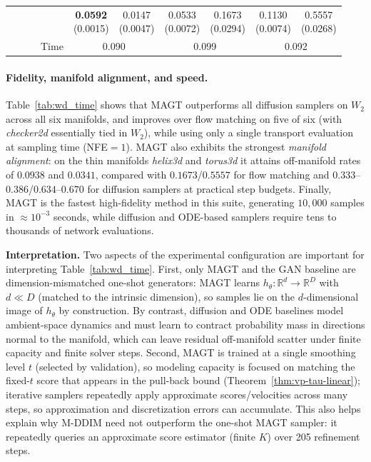 \documentclass[12pt]{article}
\theoremstyle{definition} %
\newcommand{\R}{\mathbb{R}}
\providecommand{\method}{MAGT} %
\begin{document}
\begin{table}
\begin{tabular}{l*{3}{cc}}
 & \makecell{\textbf{0.0592}\\\scriptsize(0.0015)} & \makecell{0.0147\\\scriptsize(0.0047)}
 & \makecell{0.0533\\\scriptsize(0.0072)} & \makecell{0.1673\\\scriptsize(0.0294)}
 & \makecell{0.1130\\\scriptsize(0.0074)} & \makecell{0.5557\\\scriptsize(0.0268)} \\
~~~~~~Time  & \multicolumn{2}{c}{0.090} & \multicolumn{2}{c}{0.099} & \multicolumn{2}{c}{0.092} \\
 \bottomrule
 \end{tabular}
 \end{table}
 \endgroup

\paragraph{Fidelity, manifold alignment, and speed.}
Table~\ref{tab:wd_time} shows that \method{} outperforms all diffusion samplers on $W_2$ across all six manifolds, and improves over flow matching on five of six (with \textit{checker2d} essentially tied in $W_2$), while using only a single transport evaluation at sampling time (NFE$=1$).
\method{} also exhibits the strongest \emph{manifold alignment}: on the thin manifolds \textit{helix3d} and \textit{torus3d} it attains off-manifold rates of $0.0938$ and $0.0341$, compared with $0.1673$/$0.5557$ for flow matching and $0.333$--$0.386$/$0.634$--$0.670$ for diffusion samplers at practical step budgets.
Finally, \method{} is the fastest high-fidelity method in this suite, generating $10{,}000$ samples in $\approx 10^{-3}$ seconds, while diffusion and ODE-based samplers require tens to thousands of network evaluations.

\smallskip
\noindent\textbf{Interpretation.}
Two aspects of the experimental configuration are important for interpreting Table~\ref{tab:wd_time}.
First, only \method{} and the GAN baseline are dimension-mismatched one-shot generators: \method{} learns $h_{\theta}:\R^d\to\R^D$ with $d\ll D$ (matched to the intrinsic dimension), so samples lie on the $d$-dimensional image of $h_{\theta}$ by construction.
By contrast, diffusion and ODE baselines model ambient-space dynamics and must learn to contract probability mass in directions normal to the manifold, which can leave residual off-manifold scatter under finite capacity and finite solver steps.
Second, \method{} is trained at a single smoothing level $t$ (selected by validation), so modeling capacity is focused on matching the fixed-$t$ score that appears in the pull-back bound (Theorem~\ref{thm:vp-tau-linear}); iterative samplers repeatedly apply approximate scores/velocities across many steps, so approximation and discretization errors can accumulate.
This also helps explain why M-DDIM need not outperform the one-shot \method{} sampler: it repeatedly queries an approximate score estimator (finite $K$) over 205 refinement steps.
\end{document}
